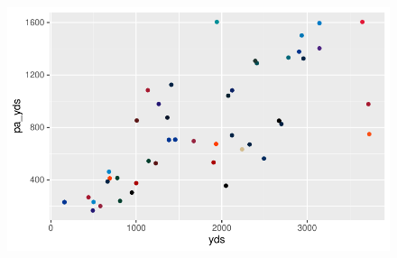 \documentclass[
  letterpaper,
]{krantz}
\begin{document}
\begin{figure}[H]

{\centering \includegraphics{04-nfl-analytics-visualization_files/figure-pdf/adding-team-color-no-nflplotr-1.pdf}

}

\end{figure}
\end{document}
